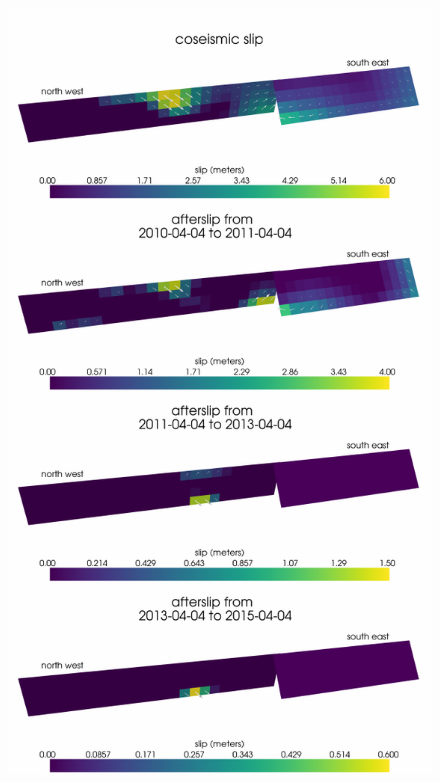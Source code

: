 \documentclass[review]{elsarticle}
\begin{document}
\begin{figure}
\includegraphics[scale=0.8]{Figures/FinalSlip}
\centering 
\caption{}
\label{fig:FinalSlip}
\end{figure}
\end{document}
